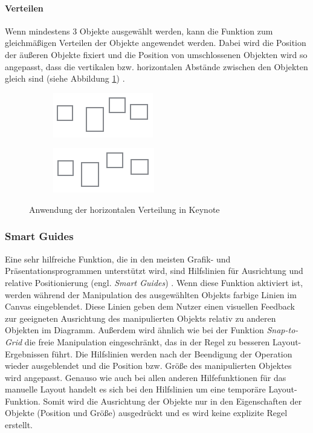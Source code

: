 \paragraph{Verteilen}

Wenn mindestens 3 Objekte ausgewählt werden, kann die Funktion zum gleichmäßigen Verteilen der Objekte angewendet werden. Dabei wird die Position der äußeren Objekte fixiert und die Position von umschlossenen Objekten wird so angepasst, dass die vertikalen bzw. horizontalen Abstände zwischen den Objekten gleich sind (siehe Abbildung \ref{fig:keynote-horizontal-distribution}) \cite{11Keynote}.

\begin{figure}[hbt]
    \newcommand{\subfigurewidth}{0.5\textwidth}
    \begin{subfigure}{\subfigurewidth}
        \centering
        \includegraphics{resources/keynote-horizontal-distribution-a}
        \caption{}
    \end{subfigure}
    \begin{subfigure}{\subfigurewidth}
        \centering
        \includegraphics{resources/keynote-horizontal-distribution-b}
        \caption{}
    \end{subfigure}
    \caption{Anwendung der horizontalen Verteilung in Keynote}
    \label{fig:keynote-horizontal-distribution}
\end{figure}

\subsubsection{Smart Guides}
\label{subsubsec:smart-guides}

Eine sehr hilfreiche Funktion, die in den meisten Grafik- und Präsentationsprogrammen unterstützt wird, sind Hilfslinien für Ausrichtung und relative Positionierung (engl. \textit{Smart Guides}) \cite{11Keynote}. Wenn diese Funktion aktiviert ist, werden während der Manipulation des ausgewählten Objekts farbige Linien im Canvas eingeblendet. Diese Linien geben dem Nutzer einen visuellen Feedback zur geeigneten Ausrichtung des manipulierten Objekts relativ zu anderen Objekten im Diagramm. Außerdem wird ähnlich wie bei der Funktion \textit{Snap-to-Grid} die freie Manipulation eingeschränkt, das in der Regel zu besseren Layout-Ergebnissen führt. Die Hilfslinien werden nach der Beendigung der Operation wieder ausgeblendet und die Position bzw. Größe des manipulierten Objektes wird angepasst. Genauso wie auch bei allen anderen Hilfefunktionen für das manuelle Layout handelt es sich bei den Hilfslinien um eine temporäre Layout-Funktion. Somit wird die Ausrichtung der Objekte nur in den Eigenschaften der Objekte (Position und Größe) ausgedrückt und es wird keine explizite Regel erstellt.

